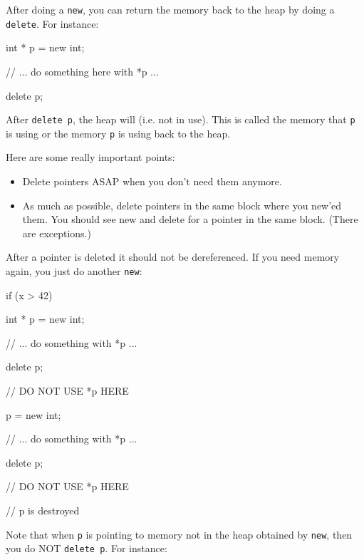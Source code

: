 \newpage{}

After doing a \texttt{new}, you can return the memory back to the heap by
doing a \texttt{delete}. For instance:


\begin{consolethree}[escapeinside=||]
int * p = new int;

// ... do something here with *p ...

delete p;
\end{consolethree}
After \texttt{delete p}, the heap will  (i.e. not in use). This is called  the memory that \texttt{p} is using or  the memory \texttt{p} is using back to the heap.

Here are some really important points:

\begin{itemize}

\item
  Delete pointers ASAP when you don't need them anymore.
\item
  As much as possible, delete pointers in the same block where you
  new'ed them. You should see new and delete for a pointer in the same
  block. (There are exceptions.)
\end{itemize}

After a pointer is deleted it should not be dereferenced. If you need memory again, you just do another \texttt{new}:

\begin{consolethree}[escapeinside=||]
if (x > 42)
{
    int * p = new int;

    // ... do something with *p ...

    delete p;

    // DO NOT USE *p HERE

    p = new int;

    // ... do something with *p ...

    delete p;

    // DO NOT USE *p HERE
}

// p is destroyed 
\end{consolethree}
Note that when \texttt{p} is pointing to memory not in the heap obtained by \texttt{new}, then you do NOT \texttt{delete p}. For instance:

